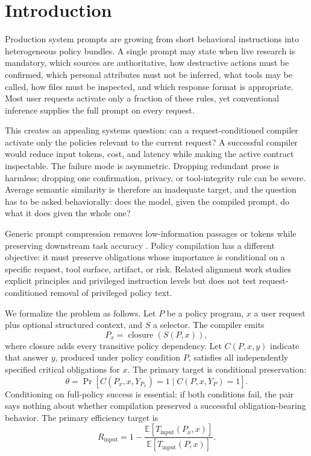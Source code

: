 \documentclass[11pt]{article}
\newcommand{\px}{P_x}
\begin{document}
\section{Introduction}

Production system prompts are growing from short behavioral instructions into heterogeneous policy bundles. A single prompt may state when live research is mandatory, which sources are authoritative, how destructive actions must be confirmed, which personal attributes must not be inferred, what tools may be called, how files must be inspected, and which response format is appropriate. Most user requests activate only a fraction of these rules, yet conventional inference supplies the full prompt on every request.

This creates an appealing systems question: can a request-conditioned compiler activate only the policies relevant to the current request? A successful compiler would reduce input tokens, cost, and latency while making the active contract inspectable. The failure mode is asymmetric. Dropping redundant prose is harmless; dropping one confirmation, privacy, or tool-integrity rule can be severe. Average semantic similarity is therefore an inadequate target, and the question has to be asked behaviorally: does the model, given the compiled prompt, do what it does given the whole one?

Generic prompt compression removes low-information passages or tokens while preserving downstream task accuracy \cite{selectivecontext,llmlingua,longllmlingua,llmlingua2}. Policy compilation has a different objective: it must preserve obligations whose importance is conditional on a specific request, tool surface, artifact, or risk. Related alignment work studies explicit principles and privileged instruction levels \cite{constitutional,instructionhierarchy} but does not test request-conditioned removal of privileged policy text.

We formalize the problem as follows. Let $P$ be a policy program, $x$ a user request plus optional structured context, and $S$ a selector. The compiler emits
\begin{equation}
  \px = \operatorname{closure}(S(P,x)),
\end{equation}
where closure adds every transitive policy dependency. Let $C(P,x,y)$ indicate that answer $y$, produced under policy condition $P$, satisfies all independently specified critical obligations for $x$. The primary target is conditional preservation:
\begin{equation}
  \theta = \Pr\!\left[C(\px,x,Y_{\px})=1 \mid C(P,x,Y_P)=1\right].
  \label{eq:preservation}
\end{equation}
Conditioning on full-policy success is essential: if both conditions fail, the pair says nothing about whether compilation preserved a successful obligation-bearing behavior. The primary efficiency target is
\begin{equation}
  R_{\mathrm{input}} = 1 - \frac{\mathbb{E}[T_{\mathrm{input}}(\px,x)]}{\mathbb{E}[T_{\mathrm{input}}(P,x)]}.
\end{equation}
\end{document}
